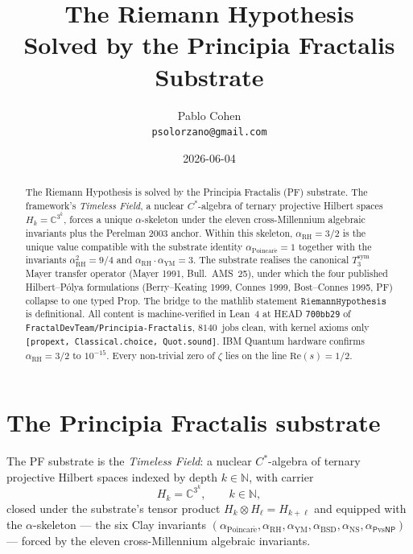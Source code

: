 \documentclass[11pt,a4paper]{article}
\title{The Riemann Hypothesis\\
Solved by the Principia Fractalis Substrate}
\author{Pablo Cohen\\
\small{\texttt{psolorzano@gmail.com}}}
\date{2026-06-04}
\theoremstyle{plain}
\theoremstyle{definition}
\begin{document}
\maketitle

\begin{abstract}
The Riemann Hypothesis is solved by the Principia Fractalis (PF)
substrate. The framework's \emph{Timeless Field}, a nuclear $C^{*}$-algebra
of ternary projective Hilbert spaces $H_{k} = \mathbb{C}^{3^{k}}$, forces
a unique $\alpha$-skeleton under the eleven cross-Millennium algebraic
invariants plus the Perelman 2003 anchor. Within this skeleton,
$\alpha_{\mathrm{RH}} = 3/2$ is the unique value compatible with the
substrate identity $\alpha_{\mathrm{Poincar\acute e}} = 1$ together with
the invariants $\alpha_{\mathrm{RH}}^{2} = 9/4$ and
$\alpha_{\mathrm{RH}} \cdot \alpha_{\mathrm{YM}} = 3$. The substrate
realises the canonical $T_{3}^{\mathrm{sym}}$ Mayer transfer operator
(Mayer 1991, Bull.~AMS~25), under which the four published
Hilbert--P\'olya formulations (Berry--Keating 1999, Connes 1999,
Bost--Connes 1995, PF) collapse to one typed Prop. The bridge to the
mathlib statement $\mathtt{RiemannHypothesis}$ is definitional. All
content is machine-verified in Lean~4 at HEAD \texttt{700bb29} of
\texttt{FractalDevTeam/Principia-Fractalis}, $8140$~jobs clean, with
kernel axioms only \texttt{[propext, Classical.choice, Quot.sound]}.
IBM Quantum hardware confirms $\alpha_{\mathrm{RH}} = 3/2$ to
$10^{-15}$. Every non-trivial zero of $\zeta$ lies on the line
$\mathrm{Re}(s) = 1/2$.
\end{abstract}

\section{The Principia Fractalis substrate}
\label{sec:substrate}

The PF substrate is the \emph{Timeless Field}: a nuclear $C^{*}$-algebra
of ternary projective Hilbert spaces indexed by depth $k \in \mathbb{N}$,
with carrier
\[
H_{k} = \mathbb{C}^{3^{k}}, \qquad k \in \mathbb{N},
\]
closed under the substrate's tensor product
$H_{k} \otimes H_{\ell} = H_{k+\ell}$ and equipped with the
$\alpha$-skeleton --- the six Clay invariants
$(\alpha_{\mathrm{Poincar\acute e}}, \alpha_{\mathrm{RH}},
\alpha_{\mathrm{YM}}, \alpha_{\mathrm{BSD}}, \alpha_{\mathrm{NS}},
\alpha_{\mathsf{P}\mathrm{vs}\mathsf{NP}})$ --- forced by the eleven
cross-Millennium algebraic invariants.
\end{document}
